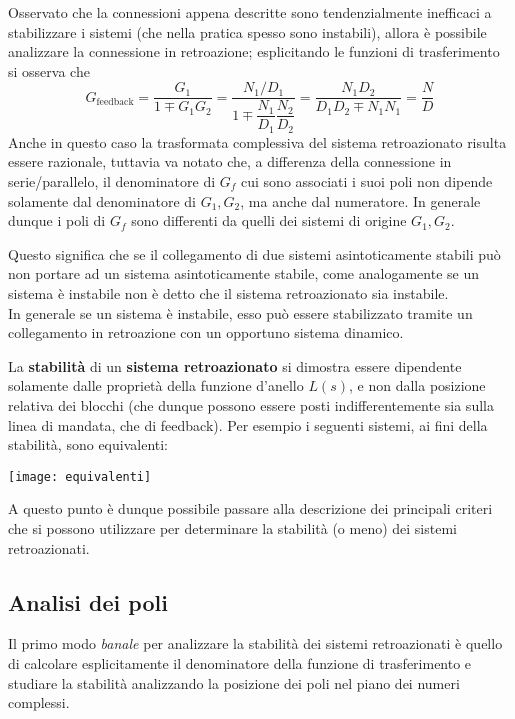 	Osservato che la connessioni appena descritte sono tendenzialmente inefficaci a stabilizzare i sistemi (che nella pratica spesso sono instabili), allora è possibile analizzare la connessione in retroazione; esplicitando le funzioni di trasferimento si osserva che
	\[ G_\textrm{feedback} = \frac{ G_1}{ 1 \mp G_1G_2} = \frac{N_1/D_1}{1\mp \dfrac{N_1}{D_1}\dfrac{N_2}{D_2}} = \frac{N_1D_2}{D_1D_2 \mp N_1N_1} = \frac N D \]
	Anche in questo caso la trasformata complessiva del sistema retroazionato risulta essere razionale, tuttavia va notato che, a differenza della connessione in serie/parallelo, il denominatore di $G_f$ cui sono associati i suoi poli non dipende solamente dal denominatore di $G_1,G_2$, ma anche dal numeratore. In generale dunque i poli di $G_f$ sono differenti da quelli dei sistemi di origine $G_1,G_2$.
	
	Questo significa che se il collegamento di due sistemi asintoticamente stabili può non portare ad un sistema asintoticamente stabile, come analogamente se un sistema è instabile non è detto che il sistema retroazionato sia instabile. \\
	In generale se un sistema è instabile, esso può essere stabilizzato tramite un collegamento in retroazione con un opportuno sistema dinamico.
		
	\begin{concetto}
		La \textbf{stabilità} di un \textbf{sistema retroazionato} si dimostra essere dipendente solamente dalle proprietà della funzione d'anello $L(s)$, e non dalla posizione relativa dei blocchi (che dunque possono essere posti indifferentemente sia sulla linea di mandata, che di feedback). Per esempio i seguenti sistemi, ai fini della stabilità, sono equivalenti:
		\begin{center}
			\texttt{[image: equivalenti]}
		\end{center}
	\end{concetto}
	A questo punto è dunque possibile passare alla descrizione dei principali criteri che si possono utilizzare per determinare la stabilità (o meno) dei sistemi retroazionati.
	
	\subsection{Analisi dei poli}
		Il primo modo \textit{banale} per analizzare la stabilità dei sistemi retroazionati è quello di calcolare esplicitamente il denominatore della funzione di trasferimento e studiare la stabilità analizzando la posizione dei poli nel piano dei numeri complessi. 
		
